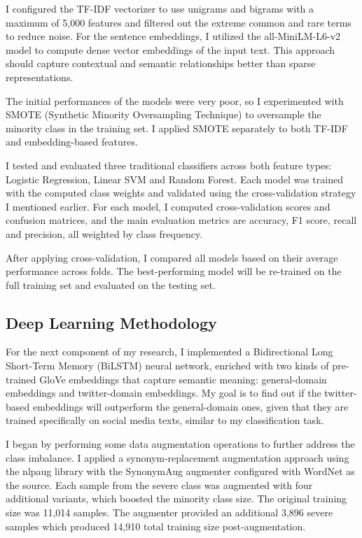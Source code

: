 I configured the TF-IDF vectorizer to use unigrams and bigrams with a maximum of 5,000 features and filtered out the extreme common and rare terms to reduce noise. For the sentence embeddings, I utilized the all-MiniLM-L6-v2 model to compute dense vector embeddings of the input text. This approach should capture contextual and semantic relationships better than sparse representations.

The initial performances of the models were very poor, so I experimented with SMOTE (Synthetic Minority Oversampling Technique) to oversample the minority class in the training set. I applied SMOTE separately to both TF-IDF and embedding-based features.

I tested and evaluated three traditional classifiers across both feature types: Logistic Regression, Linear SVM and Random Forest. Each model was trained with the computed class weights and validated using the cross-validation strategy I mentioned earlier. For each model, I computed cross-validation scores and confusion matrices, and the main evaluation metrics are accuracy, F1 score, recall and precision, all weighted by class frequency.

After applying cross-validation, I compared all models based on their average performance across folds. The best-performing model will be re-trained on the full training set and evaluated on the testing set. 

\subsection{Deep Learning Methodology}

For the next component of my research, I implemented a Bidirectional Long Short-Term Memory (BiLSTM) neural network, enriched with two kinds of pre-trained GloVe embeddings that capture semantic meaning: general-domain embeddings and twitter-domain embeddings. My goal is to find out if the twitter-based embeddings will outperform the general-domain ones, given that they are trained specifically on social media texts, similar to my classification task.

I began by performing some data augmentation operations to further address the class imbalance. I applied a synonym-replacement augmentation approach using the nlpaug library with the SynonymAug augmenter configured with WordNet as the source. Each sample from the severe class was augmented with four additional variants, which boosted the minority class size. The original training size was 11,014 samples. The augmenter provided an additional 3,896 severe samples which produced 14,910 total training size post-augmentation.

